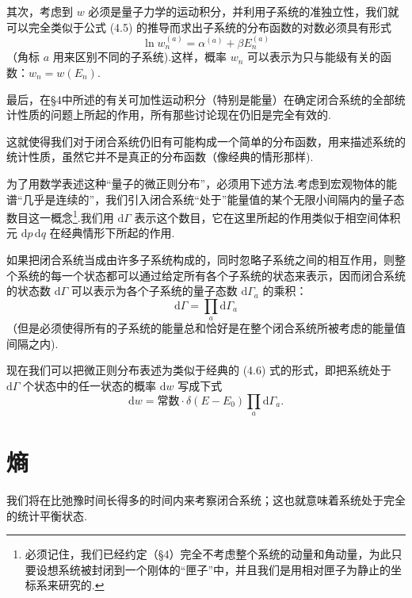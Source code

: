 其次，考虑到 $w$ 必须是量子力学的运动积分，并利用子系统的准独立性，我们就可以完全类似于公式 (4.5) 的推导而求出子系统的分布函数的对数必须具有形式
\begin{equation}
  \ln w_n^{(a)}=\alpha^{(a)}+\beta E_n^{(a)}
\end{equation}
（角标 $a$ 用来区别不同的子系统).这样，概率 $w_n$ 可以表示为只与能级有关的函数：$w_n=w(E_n)$.

最后，在§4中所述的有关可加性运动积分（特别是能量）在确定闭合系统的全部统计性质的问题上所起的作用，所有那些讨论现在仍旧是完全有效的.

这就使得我们对于闭合系统仍旧有可能构成一个简单的分布函数，用来描述系统的统计性质，虽然它并不是真正的分布函数（像经典的情形那样).

为了用数学表述这种“量子的微正则分布”，必须用下述方法.考虑到宏观物体的能谱“几乎是连续的”，我们引入闭合系统“处于”能量值的某个无限小间隔内的量子态数目这一概念\footnote{必须记住，我们已经约定（§4）完全不考虑整个系统的动量和角动量，为此只要设想系统被封闭到一个刚体的“匣子”中，并且我们是用相对匣子为静止的坐标系来研究的.}.我们用 $\mathrm{d}\Gamma$ 表示这个数目，它在这里所起的作用类似于相空间体积元 $\mathrm{d}p\,\mathrm{d}q$ 在经典情形下所起的作用.

如果把闭合系统当成由许多子系统构成的，同时忽略子系统之间的相互作用，则整个系统的每一个状态都可以通过给定所有各个子系统的状态来表示，因而闭合系统的状态数 $\mathrm{d}\Gamma$ 可以表示为各个子系统的量子态数 $\mathrm{d}\Gamma_a$ 的乘积：
\begin{equation}
  \mathrm{d}\Gamma=\prod_a\mathrm{d}\Gamma_a
\end{equation}
（但是必须使得所有的子系统的能量总和恰好是在整个闭合系统所被考虑的能量值间隔之内).

现在我们可以把微正则分布表述为类似于经典的 (4.6) 式的形式，即把系统处于 $\mathrm{d}\Gamma$ 个状态中的任一状态的概率 $\mathrm{d}w$ 写成下式
\begin{equation}
  \mathrm{d}w=\text{常数}\cdot\delta(E-E_0)\prod_a\mathrm{d}\Gamma_a.
\end{equation}

\section{熵}

我们将在比弛豫时间长得多的时间内来考察闭合系统；这也就意味着系统处于完全的统计平衡状态.

